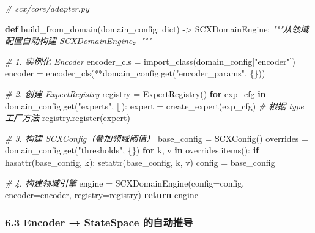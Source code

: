 \documentclass[
  12pt,
]{ctexart}
\newenvironment{Shaded}{}{}
\newcommand{\BuiltInTok}[1]{\textcolor[rgb]{0.00,0.50,0.00}{#1}}
\newcommand{\CommentTok}[1]{\textcolor[rgb]{0.38,0.63,0.69}{\textit{#1}}}
\newcommand{\ControlFlowTok}[1]{\textcolor[rgb]{0.00,0.44,0.13}{\textbf{#1}}}
\newcommand{\KeywordTok}[1]{\textcolor[rgb]{0.00,0.44,0.13}{\textbf{#1}}}
\newcommand{\NormalTok}[1]{#1}
\newcommand{\OperatorTok}[1]{\textcolor[rgb]{0.40,0.40,0.40}{#1}}
\newcommand{\StringTok}[1]{\textcolor[rgb]{0.25,0.44,0.63}{#1}}
\begin{document}
\begin{Shaded}
\begin{Highlighting}[]
\CommentTok{\# scx/core/adapter.py}

\KeywordTok{def}\NormalTok{ build\_from\_domain(domain\_config: }\BuiltInTok{dict}\NormalTok{) }\OperatorTok{{-}\textgreater{}}\NormalTok{ SCXDomainEngine:}
    \CommentTok{"""从领域配置自动构建 SCXDomainEngine。"""}

    \CommentTok{\# 1. 实例化 Encoder}
\NormalTok{    encoder\_cls }\OperatorTok{=}\NormalTok{ import\_class(domain\_config[}\StringTok{"encoder"}\NormalTok{])}
\NormalTok{    encoder }\OperatorTok{=}\NormalTok{ encoder\_cls(}\OperatorTok{**}\NormalTok{domain\_config.get(}\StringTok{"encoder\_params"}\NormalTok{, \{\}))}

    \CommentTok{\# 2. 创建 ExpertRegistry}
\NormalTok{    registry }\OperatorTok{=}\NormalTok{ ExpertRegistry()}
    \ControlFlowTok{for}\NormalTok{ exp\_cfg }\KeywordTok{in}\NormalTok{ domain\_config.get(}\StringTok{"experts"}\NormalTok{, []):}
\NormalTok{        expert }\OperatorTok{=}\NormalTok{ create\_expert(exp\_cfg)  }\CommentTok{\# 根据 type 工厂方法}
\NormalTok{        registry.register(expert)}

    \CommentTok{\# 3. 构建 SCXConfig（叠加领域阈值）}
\NormalTok{    base\_config }\OperatorTok{=}\NormalTok{ SCXConfig()}
\NormalTok{    overrides }\OperatorTok{=}\NormalTok{ domain\_config.get(}\StringTok{"thresholds"}\NormalTok{, \{\})}
    \ControlFlowTok{for}\NormalTok{ k, v }\KeywordTok{in}\NormalTok{ overrides.items():}
        \ControlFlowTok{if} \BuiltInTok{hasattr}\NormalTok{(base\_config, k):}
            \BuiltInTok{setattr}\NormalTok{(base\_config, k, v)}
\NormalTok{    config }\OperatorTok{=}\NormalTok{ base\_config}

    \CommentTok{\# 4. 构建领域引擎}
\NormalTok{    engine }\OperatorTok{=}\NormalTok{ SCXDomainEngine(config}\OperatorTok{=}\NormalTok{config, encoder}\OperatorTok{=}\NormalTok{encoder, registry}\OperatorTok{=}\NormalTok{registry)}
    \ControlFlowTok{return}\NormalTok{ engine}
\end{Highlighting}
\end{Shaded}

\subsubsection{6.3 Encoder → StateSpace
的自动推导}\label{encoder-statespace-ux7684ux81eaux52a8ux63a8ux5bfc}
\end{document}
